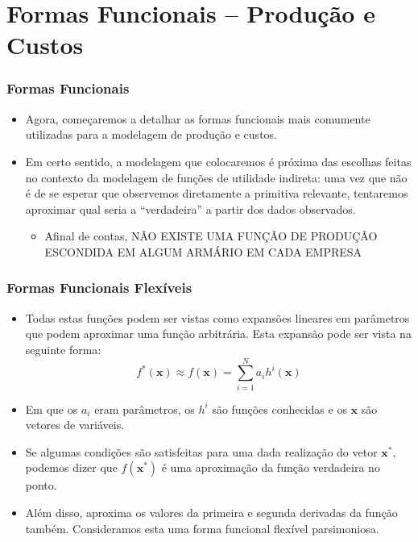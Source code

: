 \documentclass{beamer}
\begin{document}
\section{Formas Funcionais -- Produção e Custos}
\begin{frame}\frametitle{Formas Funcionais}

\begin{itemize}
\item Agora, começaremos a detalhar as formas funcionais mais comumente
utilizadas para a modelagem de produção e custos.
\item Em certo sentido, a modelagem que colocaremos é próxima das escolhas
feitas no contexto da modelagem de funções de utilidade indireta:
uma vez que não é de se esperar que observemos diretamente a primitiva
relevante, tentaremos aproximar qual seria a ``verdadeira'' a partir
dos dados observados.

\begin{itemize}
\item Afinal de contas, NÃO EXISTE UMA FUNÇÃO DE PRODUÇÃO ESCONDIDA EM ALGUM
ARMÁRIO EM CADA EMPRESA
\end{itemize}
\end{itemize}
\end{frame}

\begin{frame}\frametitle{Formas Funcionais Flexíveis}

\begin{itemize}
\item Todas estas funções podem ser vistas como expansões lineares em parâmetros
que podem aproximar uma função arbitrária. Esta expansão pode ser
vista na seguinte forma:
\[
f^{*}(\mathbf{x})\approx f(\mathbf{x})=\sum_{i=1}^{N}a_{i}h^{i}(\mathbf{x})
\]
\item Em que os $a_{i}$ eram parâmetros, os $h^{i}$ são funções conhecidas
e os $\mathbf{x}$ são vetores de variáveis. 
\item Se algumas condições são satisfeitas para uma dada realização do vetor
$\mathbf{x}^{*}$, podemos dizer que $f(\mathbf{x}^{*})$ é uma aproximação
da função verdadeira no ponto. 
\item Além disso, aproxima os valores da primeira e segunda derivadas da
função também. Consideramos esta uma forma funcional flexível parsimoniosa.
\end{itemize}
\end{frame}
\end{document}
